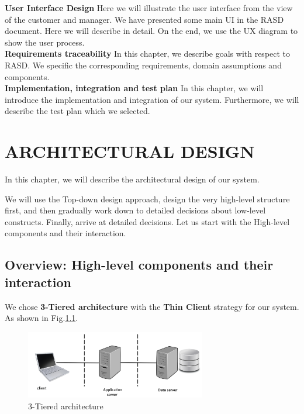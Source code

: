 \documentclass[a4paper,12pt]{report}
\begin{document}
\textbf{User Interface Design}
Here we will illustrate the user interface from the view of the customer and manager.
We have presented some main UI in the RASD document.
Here we will describe in detail.
On the end, we use the UX diagram to show the user process.~\\



\textbf{Requirements traceability}
In this chapter, we describe goals with respect to RASD. We specific the corresponding requirements, domain assumptions and components.~\\

\textbf{Implementation, integration and test plan}
In this chapter, we will introduce the implementation and integration of our system.
Furthermore, we will describe the test plan which we selected.


\chapter{ARCHITECTURAL DESIGN}\label{ch:architectural-design}

In this chapter, we will describe the architectural design of our system.

We will use the Top-down design approach, design the very high-level structure first,
and then gradually work down to detailed decisions about low-level constructs.
Finally, arrive at detailed decisions.\cite{SlidesSE2}
Let us start with the High-level components and their interaction.


\section{Overview: High-level components and their interaction}\label{sec:ArchitectureOverview}

We chose \textbf{3-Tiered architecture} with the \textbf{Thin Client} strategy for our system.
As shown in Fig.\ref{fig:ThreeTieredArchitecture}.\cite{SistemiInformativi}

\begin{figure}[H]
	\centering
	\includegraphics[width=0.7\textwidth]{ThreeTiered}
	\caption{3-Tiered architecture}
	\centering
	\label{fig:ThreeTieredArchitecture}
\end{figure}
\end{document}
